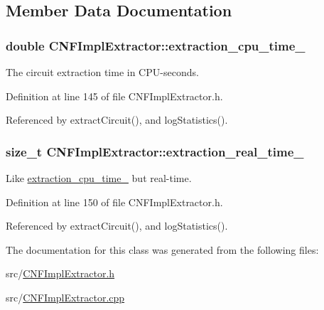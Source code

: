 \subsection{Member Data Documentation}
\hypertarget{classCNFImplExtractor_ab8be06d42fd3c4b569ec22cfcf2f508e}{
\subsubsection[{extraction\-\_\-cpu\-\_\-time\-\_\-}]{\setlength{\rightskip}{0pt plus 5cm}double C\-N\-F\-Impl\-Extractor\-::extraction\-\_\-cpu\-\_\-time\-\_\-\hspace{0.3cm}{\ttfamily [protected]}}}\label{classCNFImplExtractor_ab8be06d42fd3c4b569ec22cfcf2f508e}


The circuit extraction time in C\-P\-U-\/seconds. 



Definition at line 145 of file C\-N\-F\-Impl\-Extractor.\-h.



Referenced by extract\-Circuit(), and log\-Statistics().

\hypertarget{classCNFImplExtractor_ae06413cf08f868357d64545b3041aa18}{
\subsubsection[{extraction\-\_\-real\-\_\-time\-\_\-}]{\setlength{\rightskip}{0pt plus 5cm}size\-\_\-t C\-N\-F\-Impl\-Extractor\-::extraction\-\_\-real\-\_\-time\-\_\-\hspace{0.3cm}{\ttfamily [protected]}}}\label{classCNFImplExtractor_ae06413cf08f868357d64545b3041aa18}


Like \hyperlink{classCNFImplExtractor_ab8be06d42fd3c4b569ec22cfcf2f508e}{extraction\-\_\-cpu\-\_\-time\-\_\-} but real-\/time. 



Definition at line 150 of file C\-N\-F\-Impl\-Extractor.\-h.



Referenced by extract\-Circuit(), and log\-Statistics().



The documentation for this class was generated from the following files\-:\begin{DoxyCompactItemize}
\item 
src/\hyperlink{CNFImplExtractor_8h}{C\-N\-F\-Impl\-Extractor.\-h}\item 
src/\hyperlink{CNFImplExtractor_8cpp}{C\-N\-F\-Impl\-Extractor.\-cpp}\end{DoxyCompactItemize}

